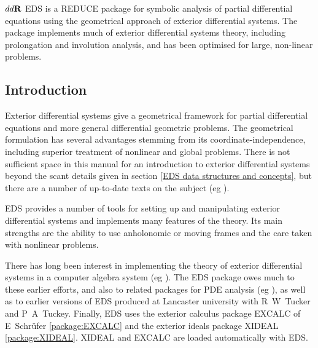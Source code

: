 

\newcommand{\deriv}{\mathrm{d}}
\newcommand{\union}{\cup}
\def\R{\hbox{\bf R}}
\newcommand{\del}{\partial}
\newcommand{\optional}[1]{$\,[$#1$]\,$}
\newenvironment{edssyntax}
   {\begin{list}{}{\tt}\item[]}
   {\end{list}}

\ifdefined\HCode
\(
\def\deriv{\mathrm{d}}
\def\union{\cup}
\def\R{\mathbf{R}}
\def\del{\partial}
\)%
\fi
%
EDS is a REDUCE package for symbolic analysis of partial differential
equations using the geometrical approach of exterior differential
systems. The package implements much of exterior differential systems
theory, including prolongation and involution analysis, and has been
optimised for large, non-linear problems. 



\subsection{Introduction}

Exterior differential systems give a geometrical framework for partial
differential equations and more general differential geometric problems.
The geometrical formulation has several advantages stemming from its
coordinate-independence, including superior treatment of nonlinear and
global problems. There is not sufficient space in this manual for an
introduction to exterior differential systems beyond the scant details
given in section \ref{EDS data structures and concepts}, but there are a
number of up-to-date texts on the subject (eg \cite{Bryant:1991,Spivak:1979}). 

EDS provides a number of tools for setting up and manipulating exterior
differential systems and implements many features of the theory. Its main
strengths are the ability to use anholonomic or moving frames and the care
taken with nonlinear problems.

There has long been interest in implementing the theory of exterior
differential systems in a computer algebra system (eg
\cite{Arais:1974,Ganzha:1981,Hartley:91}). The EDS package owes much to these
earlier efforts, and also to related packages for PDE analysis (eg
\cite{Mansfield:1993,reid_1991,Seiler:1995}), as well as to earlier versions of
EDS produced at Lancaster university with R~W~Tucker and
P~A~Tuckey. Finally, EDS uses the exterior calculus package EXCALC of
E~Schr{\"u}fer \ref{package:EXCALC} and the exterior ideals package XIDEAL
\ref{package:XIDEAL}. XIDEAL and EXCALC are loaded automatically with EDS.


